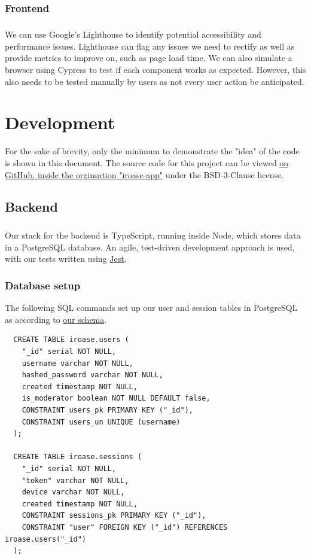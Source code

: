 \documentclass{report}
\begin{document}
\subsection{Frontend}
\paragraph{}
We can use Google's Lighthouse to identify potential accessibility and performance issues. Lighthouse can flag any issues we need to rectify as well as provide metrics to improve on, such as page load time. We can also simulate a browser using Cypress to test if each component works as expected. However, this also needs to be tested manually by users as not every user action be anticipated.

\chapter{Development}
For the sake of brevity, only the minimum to demonstrate the "idea" of the code is shown in this document. The source code for this project can be viewed \href{https://github.com/iroase-app}{on GitHub, inside the orginsation "iroase-app"} under the BSD-3-Clause license.

\section{Backend}
\paragraph{}
Our stack for the backend is TypeScript, running inside Node, which stores data in a PostgreSQL database. An agile, test-driven development approach is used, with our tests written using \href{https://jestjs.io}{Jest}.

\subsection{Database setup}
The following SQL commands set up our user and session tables in PostgreSQL as according to \hyperref[fig:database1]{our schema}.

\begin{verbatim}
  CREATE TABLE iroase.users (
    "_id" serial NOT NULL,
    username varchar NOT NULL,
    hashed_password varchar NOT NULL,
    created timestamp NOT NULL,
    is_moderator boolean NOT NULL DEFAULT false,
    CONSTRAINT users_pk PRIMARY KEY ("_id"),
    CONSTRAINT users_un UNIQUE (username)
  );

  CREATE TABLE iroase.sessions (
    "_id" serial NOT NULL,
    "token" varchar NOT NULL,
    device varchar NOT NULL,
    created timestamp NOT NULL,
    CONSTRAINT sessions_pk PRIMARY KEY ("_id"),
    CONSTRAINT "user" FOREIGN KEY ("_id") REFERENCES iroase.users("_id")
  );
  
\end{verbatim}
\end{document}
